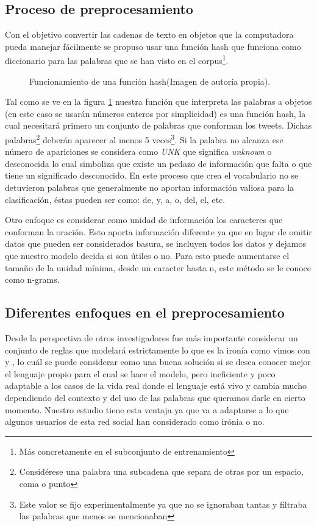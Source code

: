 \subsection{Proceso de preprocesamiento}
\par Con el objetivo convertir las cadenas de texto en objetos que la computadora pueda manejar fácilmente se propuso usar una función hash que funciona como diccionario para las palabras que se han visto en el corpus\footnote{Más concretamente en el subconjunto de entrenamiento}.
\begin{figure}[h!]
	\centering
	
	\caption{Funcionamiento de una función hash(Imagen de autoría propia).}
	\label{fig:funcionHash}
\end{figure}
\par Tal como se ve en la figura \ref{fig:funcionHash} nuestra función que interpreta las palabras a objetos (en este caso se usarán números enteros por simplicidad) es una función hash, la cual necesitará primero un conjunto de palabras que conforman los tweets. Dichas palabras\footnote{Considérese
	una palabra una subcadena que separa de otras por un espacio, coma o punto} deberán aparecer al menos 5 veces\footnote{Este valor se fijo experimentalmente ya que no se ignoraban tantas y filtraba las palabras que menos se mencionaban}. Si la palabra no alcanza ese número de apariciones se considera como \textit{UNK} que significa \textit{unknown} o desconocida lo cual simboliza que existe un pedazo de información que falta o que tiene un significado desconocido. En este proceso que crea el vocabulario no se detuvieron palabras que generalmente no aportan información valiosa para la clasificación, éstas pueden ser como: de, y, a, o, del, el, etc. 
	
	\par Otro enfoque es considerar como unidad de información los caracteres que conforman la oración. Esto aporta información diferente ya que en lugar de omitir datos que pueden ser considerados basura, se incluyen todos los datos y dejamos que nuestro modelo decida si son útiles o no. Para esto puede aumentarse el tamaño de la unidad mínima, desde un caracter hasta n, este método se le conoce como n-grams.
	
\subsection{Diferentes enfoques en el preprocesamiento}
\par Desde la perspectiva de otros investigadores fue más importante considerar un conjunto de reglas que modelará estrictamente lo que es la ironía como vimos con \cite{utsumi1996unified} y \cite{kong2011formalization}, lo cuál se puede considerar como una buena solución si se desea conocer mejor el lenguaje propio para el cual se  hace el modelo, pero ineficiente y poco adaptable a los casos de la vida real donde el lenguaje está vivo y cambia mucho dependiendo del contexto y del uso de las palabras que queramos darle en cierto momento. Nuestro estudio tiene esta ventaja ya que va a adaptarse a lo que algunos usuarios de esta red social han considerado como irónia o no.

